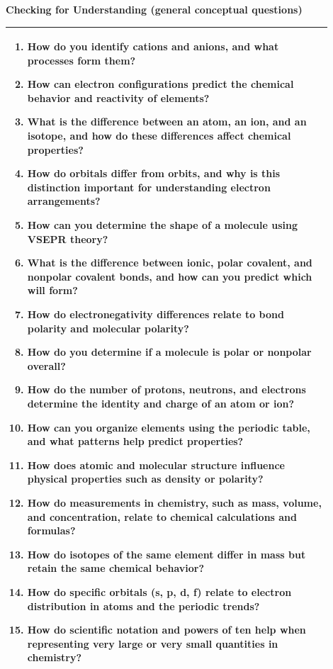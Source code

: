 \documentclass{article}
\begin{document}
\newpage
{\large\textbf{Checking for Understanding (general conceptual questions)}}\\
\noindent \begin{tabular}{|p{0.9\linewidth}|}
\hline
\vspace{0.2cm}
\begin{enumerate}
    \item How do you identify cations and anions, and what processes form them?
    \item How can electron configurations predict the chemical behavior and reactivity of elements?
    \item What is the difference between an atom, an ion, and an isotope, and how do these differences affect chemical properties?
    \item How do orbitals differ from orbits, and why is this distinction important for understanding electron arrangements?
    \item How can you determine the shape of a molecule using VSEPR theory?
    \item What is the difference between ionic, polar covalent, and nonpolar covalent bonds, and how can you predict which will form?
    \item How do electronegativity differences relate to bond polarity and molecular polarity?
    \item How do you determine if a molecule is polar or nonpolar overall?
    \item How do the number of protons, neutrons, and electrons determine the identity and charge of an atom or ion?
    \item How can you organize elements using the periodic table, and what patterns help predict properties?
    \item How does atomic and molecular structure influence physical properties such as density or polarity?
    \item How do measurements in chemistry, such as mass, volume, and concentration, relate to chemical calculations and formulas?
    \item How do isotopes of the same element differ in mass but retain the same chemical behavior?
    \item How do specific orbitals (s, p, d, f) relate to electron distribution in atoms and the periodic trends?
    \item How do scientific notation and powers of ten help when representing very large or very small quantities in chemistry?
\end{enumerate}
\\
\hline
\end{tabular}
\newpage
\end{document}
